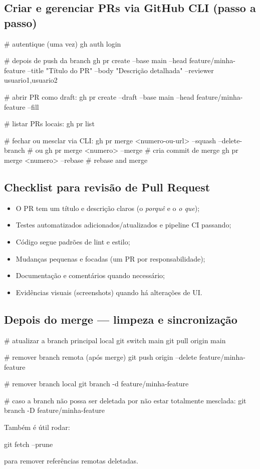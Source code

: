\subsection{Criar e gerenciar PRs via GitHub CLI (passo a passo)}
\begin{bashcode}
# autentique (uma vez)
gh auth login

# depois de push da branch
gh pr create --base main --head feature/minha-feature --title "Título do PR" --body "Descrição detalhada" --reviewer usuario1,usuario2

# abrir PR como draft:
gh pr create --draft --base main --head feature/minha-feature --fill

# listar PRs locais:
gh pr list

# fechar ou mesclar via CLI:
gh pr merge <numero-ou-url> --squash --delete-branch
# ou
gh pr merge <numero> --merge      # cria commit de merge
gh pr merge <numero> --rebase     # rebase and merge
\end{bashcode}

\subsection{Checklist para revisão de Pull Request}
\begin{itemize}
  \item O PR tem um título e descrição claros (o \emph{porquê} e o \emph{o que});  
  \item Testes automatizados adicionados/atualizados e pipeline CI passando;  
  \item Código segue padrões de lint e estilo;  
  \item Mudanças pequenas e focadas (um PR por responsabilidade);  
  \item Documentação e comentários quando necessário;  
  \item Evidências visuais (screenshots) quando há alterações de UI.  
\end{itemize}

\subsection{Depois do merge — limpeza e sincronização}
\begin{bashcode}
# atualizar a branch principal local
git switch main
git pull origin main

# remover branch remota (após merge)
git push origin --delete feature/minha-feature

# remover branch local
git branch -d feature/minha-feature

# caso a branch não possa ser deletada por não estar totalmente mesclada:
git branch -D feature/minha-feature
\end{bashcode}
Também é útil rodar:
\begin{bashcode}
git fetch --prune
\end{bashcode}
para remover referências remotas deletadas.

